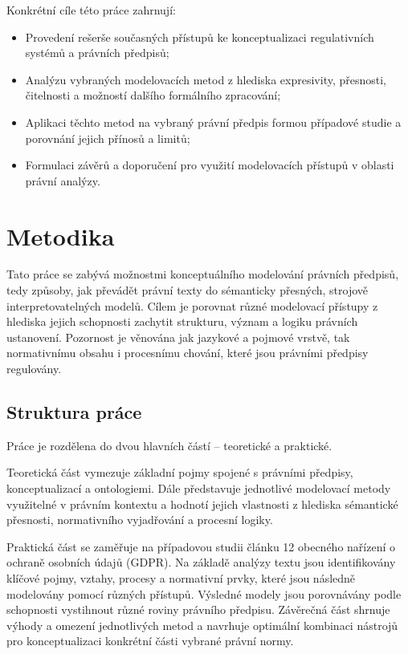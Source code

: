 Konkrétní cíle této práce zahrnují:

\begin{itemize}
  \item Provedení rešerše současných přístupů ke konceptualizaci regulativních systémů a právních předpisů;
  \item Analýzu vybraných modelovacích metod z hlediska expresivity, přesnosti, čitelnosti a možností dalšího formálního zpracování;
  \item Aplikaci těchto metod na vybraný právní předpis formou případové studie a porovnání jejich přínosů a limitů;
  \item Formulaci závěrů a doporučení pro využití modelovacích přístupů v oblasti právní analýzy.
\end{itemize}

\chapter{Metodika}
\label{sec:metodika}
Tato práce se zabývá možnostmi konceptuálního modelování právních předpisů, tedy způsoby, jak převádět právní texty do sémanticky přesných, strojově interpretovatelných modelů. Cílem je porovnat různé modelovací přístupy z hlediska jejich schopnosti zachytit strukturu, význam a logiku právních ustanovení. Pozornost je věnována jak jazykové a pojmové vrstvě, tak normativnímu obsahu i procesnímu chování, které jsou právními předpisy regulovány.


\section{Struktura práce}
\label{sec:struktur-práce}
Práce je rozdělena do dvou hlavních částí – teoretické a praktické.

Teoretická část vymezuje základní pojmy spojené s právními předpisy, konceptualizací a ontologiemi. Dále představuje jednotlivé modelovací metody využitelné v právním kontextu a hodnotí jejich vlastnosti z hlediska sémantické přesnosti, normativního vyjadřování a procesní logiky.

Praktická část se zaměřuje na případovou studii článku 12 obecného nařízení o ochraně osobních údajů (GDPR). Na základě analýzy textu jsou identifikovány klíčové pojmy, vztahy, procesy a normativní prvky, které jsou následně modelovány pomocí různých přístupů. Výsledné modely jsou porovnávány podle schopnosti vystihnout různé roviny právního předpisu. Závěrečná část shrnuje výhody a omezení jednotlivých metod a navrhuje optimální kombinaci nástrojů pro konceptualizaci konkrétní části vybrané právní normy.

